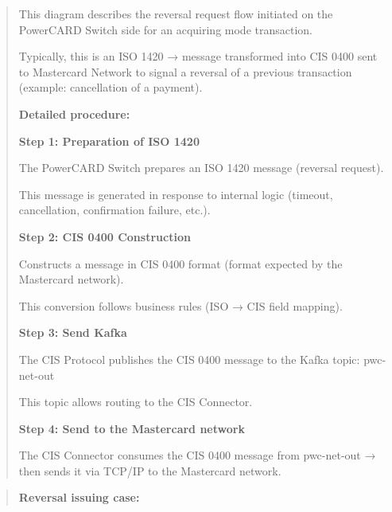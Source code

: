 \documentclass[12pt,a4paper]{report}
\begin{document}
\begin{quote}
This diagram describes the reversal request flow initiated on the
PowerCARD Switch side for an acquiring mode transaction.

Typically, this is an ISO 1420 → message transformed into CIS 0400 sent
to Mastercard Network to signal a reversal of a previous transaction
(example: cancellation of a payment).

\textbf{Detailed procedure:}

\textbf{Step 1: Preparation of ISO 1420}

The PowerCARD Switch prepares an ISO 1420 message (reversal request).

This message is generated in response to internal logic (timeout,
cancellation, confirmation failure, etc.).

\textbf{Step 2: CIS 0400 Construction}

Constructs a message in CIS 0400 format (format expected by the
Mastercard network).

This conversion follows business rules (ISO → CIS field mapping).

\textbf{Step 3: Send Kafka}

The CIS Protocol publishes the CIS 0400 message to the Kafka topic:
pwc-net-out

This topic allows routing to the CIS Connector.

\textbf{Step 4: Send to the Mastercard network}

The CIS Connector consumes the CIS 0400 message from pwc-net-out → then
sends it via TCP/IP to the Mastercard network.
\end{quote}
\clearpage
\begin{quote}
\textbf{Reversal issuing case:}  
\end{quote}
\end{document}
